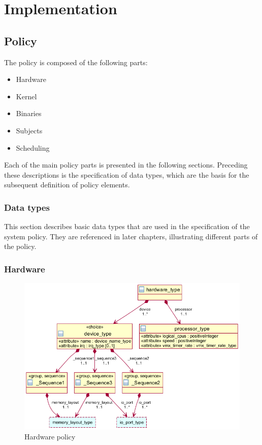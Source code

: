 \chapter{Implementation}

\section{Policy}
The policy is composed of the following parts:

\begin{itemize}
	\item Hardware
	\item Kernel
	\item Binaries
	\item Subjects
	\item Scheduling
\end{itemize}

Each of the main policy parts is presented in the following sections. Preceding
these descriptions is the specification of data types, which are the basis for
the subsequent definition of policy elements.

\subsection{Data types}
This section describes basic data types that are used in the specification of
the system policy. They are referenced in later chapters, illustrating different
parts of the policy.



\subsection{Hardware}
\begin{figure}[h]
	\centering
	\includegraphics[width=\textwidth]{images/xml_hardware.png}
	\caption{Hardware policy}
\end{figure}


